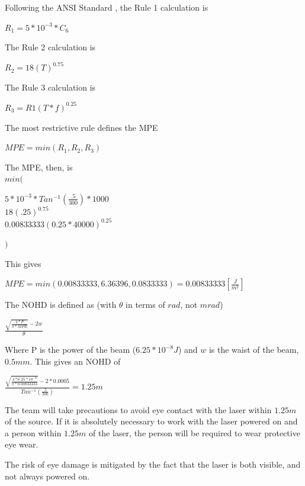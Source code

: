 \documentclass[letterpaper,10pt]{article}
\begin{document}
\begin{spacing}{1.15}
Following the ANSI Standard \cite{ANSI}, the Rule 1 calculation is 
\begin{center}
	\large
    $R_1 = 5*10^{-3} * C_6$
\end{center}

The Rule 2 calculation is
\begin{center}
	\large
	$R_2 = 18 (T)^{0.75}$
\end{center}

The Rule 3 calculation is
\begin{center}
	\large
	$R_3 = R1(T*f)^{0.25}$
\end{center}

The most restrictive rule defines the MPE 
\begin{center}
	\large
	$MPE = min(R_1, R_2, R_3)$
\end{center}

The MPE, then, is\\
{\large $min($}
\begin{center}
	\large
	$ 5*10^{-3} * Tan^{-1}(\frac{.5}{300})* 1000$\\
	$18 (.25)^{0.75}$ \\
	$0.00833333 (0.25*40000)^{0.25}$
\end{center}
{\large $)$}

This gives 
\begin{center}
	\large
	$MPE = min(0.00833333, 6.36396, 0.0833333) = 0.00833333 [\frac{J}{m^2}]$
\end{center}

The NOHD is defined as (with $\theta$ in terms of $rad$, not $mrad$)
\begin{center}
	\large
$ \frac{\sqrt{\frac{4 * P}{\pi * MPE}} - 2w}{\theta}$
\end{center}

Where P is the power of the beam ($6.25*10^{-8} J$) and $w$ is the waist of the beam, $0.5mm$. This gives an NOHD of 
\begin{center}
	\large
	$ \frac{\sqrt{\frac{4 * 6.25*10^{-8} }{\pi * 0.00833333}} - 2*0.0005}{Tan^{-1}(\frac{.5}{300})} = 1.25 m$
\end{center}

The team will take precautions to avoid eye contact with the laser within $1.25m$ of the source. If it is absolutely necessary to work with the laser powered on and a person within $1.25m$ of the laser, the person will be required to wear protective eye wear. 

The risk of eye damage is mitigated by the fact that the laser is both visible, and not always powered on. 


\end{spacing}
\end{document}
